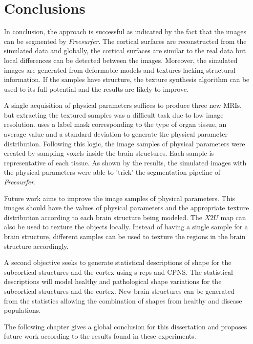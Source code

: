 \section{Conclusions}
\label{sec:ConclusionsSimu}

In conclusion, the approach is successful as
indicated by the fact that the images can be segmented by \textit{Freesurfer}. 
The cortical surfaces are reconstructed from the simulated data and globally, the cortical surfaces are similar to the real data
but local differences can be detected between the images.
Moreover, the simulated images are generated from
deformable models and textures lacking structural information. 
If the samples have structure, the texture synthesis algorithm 
can be used to its full potential and the results are likely to improve.

A single acquisition of physical parameters suffices to produce three new MRIs, but
extracting the textured samples was a difficult task due to low image resolution. 
\cite{CHAR-09} uses a label mask corresponding to the type of organ tissue, an average value and a standard deviation to 
generate the physical parameter distribution.
Following this logic, the image samples of physical parameters were 
created by sampling voxels inside the brain structures. Each sample is representative 
of each tissue.
As shown by the results, 
the simulated images with the physical parameters were able to 'trick' 
the segmentation pipeline of \textit{Freesurfer}. 

Future work aims to improve the image samples of physical parameters. This images 
should have the values of physical parameters and the appropriate texture distribution
according to each brain structure being modeled.
The $X2U$ map can also be used to texture the objects locally. 
Instead of having a single sample for a brain structure, 
different samples can be used to texture 
the regions in the brain structure accordingly. 

A second objective seeks to generate statistical descriptions of shape 
for the subcortical structures and the cortex using s-reps and CPNS.
The statistical descriptions will model healthy and pathological shape variations
for the subcortical structures and the cortex.
New brain structures can be generated from the statistics
allowing the combination of shapes from healthy and disease populations. 

The following chapter gives a global conclusion for this dissertation and proposes
future work according to the results found in these experiments.